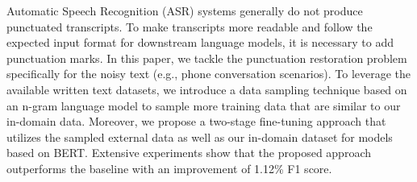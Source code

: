 Automatic Speech Recognition (ASR) systems generally do not produce punctuated transcripts. To make transcripts more readable and follow the expected input format for downstream language models, it is necessary to add punctuation marks. In this paper, we tackle the punctuation restoration problem specifically for the noisy text (e.g., phone conversation scenarios). To leverage the available written text datasets, we introduce a data sampling technique based on an n-gram language model to sample more training data that are similar to our in-domain data. Moreover, we propose a two-stage fine-tuning approach that utilizes the sampled external data as well as our in-domain dataset for models based on BERT. Extensive experiments show that the proposed approach outperforms the baseline with an improvement of 1.12\% F1 score.
